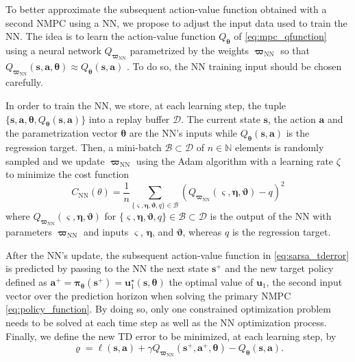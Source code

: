 \documentclass[letterpaper, 10pt, conference]{ieeeconf}
\begin{document}
To better approximate the subsequent action-value function obtained with a second NMPC \cite{moradimaryamnegari2022model} using a NN, we propose to adjust the input data used to train the NN.
The idea is to learn the action-value function $Q_{\boldsymbol{\theta}}$ of \eqref{eq:mpc_qfunction} using a neural network $Q_{\boldsymbol{\varpi}_{\text{NN}}}$ parametrized by the weights $\boldsymbol{\varpi}_{\text{NN}}$ so that $Q_{\boldsymbol{\varpi}_{\text{NN}}}(\mathbf{s},\mathbf{a},\boldsymbol{\theta}) \approx Q_{\boldsymbol{\theta}}(\mathbf{s},\mathbf{a})$ .
To do so, the NN training input should be chosen carefully.

In order to train the NN, we store, at each learning step, the tuple $\{\mathbf{s}, \mathbf{a}, \boldsymbol{\theta},  Q_{\boldsymbol{\theta}}\left(\mathbf{s}, \mathbf{a}\right)\}$ into a replay buffer $\mathcal{D}$.
The current state $\mathbf{s}$, the action $\mathbf{a}$ and the parametrization vector $\boldsymbol{\theta}$ are the NN's inputs while $Q_{\boldsymbol{\theta}}\left(\mathbf{s}, \mathbf{a}\right)$ is the regression target.
Then, a mini-batch $\mathcal{B}\subset\mathcal{D}$ of $n\in\mathbb{N}$ elements is randomly sampled and we update $\boldsymbol{\varpi}_{\text{NN}}$ using the Adam algorithm \cite{kingma2014adam} with a learning rate $\zeta$ to minimize the cost function
	\begin{equation} \label{eq:cost_training_nn}
		C_{\text{NN}}(\theta) = \frac{1}{n}\sum_{\{\boldsymbol{\varsigma},\boldsymbol{\eta},\boldsymbol{\vartheta},q\}\in\mathcal{B}}\left(Q_{\boldsymbol{\varpi}_{\text{NN}}}(\boldsymbol{\varsigma}, \boldsymbol{\eta}, \boldsymbol{\vartheta}) - q\right)^2
	\end{equation}
where $Q_{\boldsymbol{\varpi}_{\text{NN}}}(\boldsymbol{\varsigma}, \boldsymbol{\eta}, \boldsymbol{\vartheta})$ for $\{\boldsymbol{\varsigma}, \boldsymbol{\eta}, \boldsymbol{\vartheta}, q\}\in\mathcal{B}\subset\mathcal{D}$ is the output of the NN with parameters $\boldsymbol{\varpi}_{\text{NN}}$ and inputs $\boldsymbol{\varsigma}$, $\boldsymbol{\eta}$, and $\boldsymbol{\vartheta}$, whereas $q$ is the regression target.

After the NN's update, the subsequent action-value function in \eqref{eq:sarsa_tderror} is predicted by passing to the NN the next state $\mathbf{s}^+$ and the new target policy defined as $\mathbf{a}^+ = \boldsymbol{\pi}_{\boldsymbol{\theta}}(\mathbf{s}^+) = \mathbf{u}_1^{\star}(\mathbf{s}, \boldsymbol{\theta})$ the optimal value of $\mathbf{u}_1$, the second input vector over the prediction horizon when solving the primary NMPC \eqref{eq:policy_function}.
By doing so, only one constrained optimization problem needs to be solved at each time step as well as the NN optimization process.
Finally, we define the new TD error to be minimized, at each learning step, by
	\begin{equation} \label{eq:ddes_modified_td_error}
		\varrho = \ell\left(\mathbf{s}, \mathbf{a}\right)  + \gamma Q_{\boldsymbol{\varpi}_{\text{NN}}}(\mathbf{s}^+,\mathbf{a}^+, \boldsymbol{\theta}) - Q_{\boldsymbol{\theta}}\left(\mathbf{s}, \mathbf{a}\right)\text{.}
	\end{equation}
\end{document}
